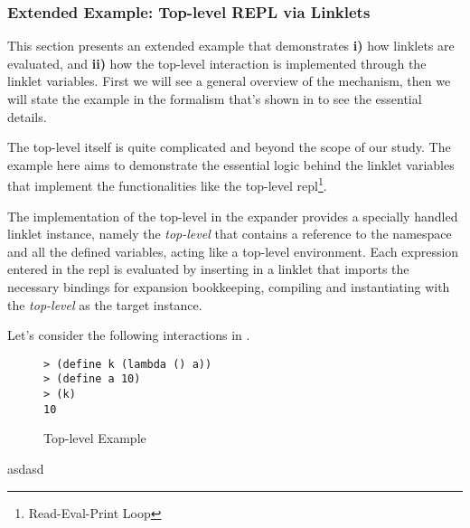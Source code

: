 \subsubsection{Extended Example: Top-level REPL via Linklets}
\label{subsec:toplevel-example}

This section presents an extended example that demonstrates
\textbf{i)} how linklets are evaluated, and \textbf{ii)} how the
top-level interaction is implemented through the linklet
variables. First we will see a general overview of the mechanism, then
we will state the example in the formalism that's shown in
 to see the essential details.

The top-level itself is quite complicated and beyond the scope of our
study. The example here aims to demonstrate the essential logic behind
the linklet variables that implement the functionalities like the
top-level repl\footnote{Read-Eval-Print Loop}.

The implementation of the top-level in the expander provides a
specially handled linklet instance, namely the \emph{top-level} that
contains a reference to the namespace and all the defined variables,
acting like a top-level environment. Each expression entered in the
repl is evaluated by inserting in a linklet that imports the necessary
bindings for expansion bookkeeping, compiling and instantiating with
the \emph{top-level} as the target instance.

Let's consider the following
interactions in .

\begin{wrapfigure}{r}{0.3\textwidth}
  \begin{mdframed}
    \begin{verbatim}
> (define k (lambda () a))
> (define a 10)
> (k)
10
\end{verbatim}
    \caption{Top-level Example}
    \label{fig:toplevel-interaction}

  \end{mdframed}
\end{wrapfigure}

asdasd

